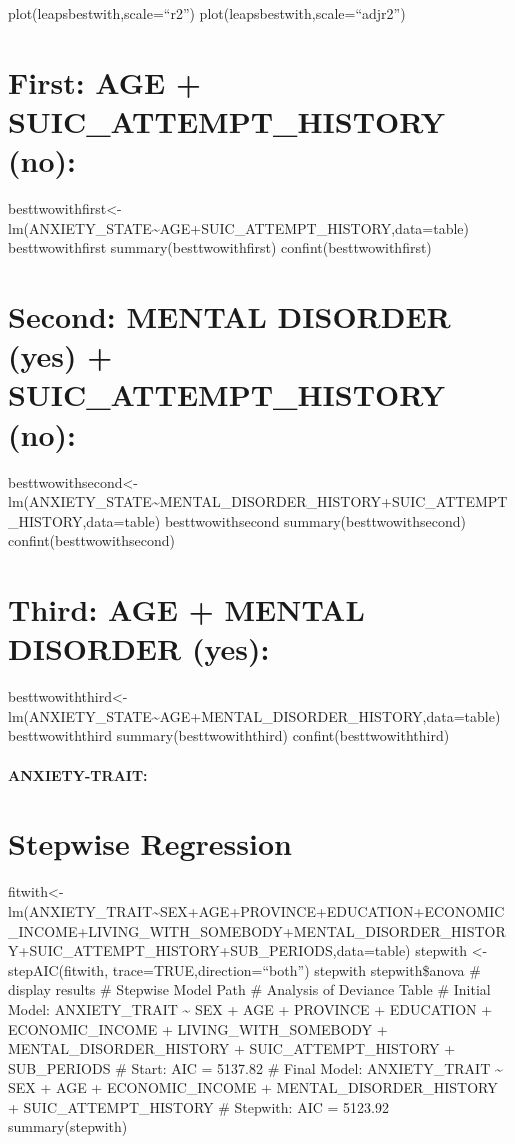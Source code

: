 \documentclass[
]{book}
\begin{document}
plot(leapsbestwith,scale=``r2'')
plot(leapsbestwith,scale=``adjr2'')

\hypertarget{first-age-suic_attempt_history-no-1}{%
\chapter{First: AGE + SUIC\_ATTEMPT\_HISTORY (no):}\label{first-age-suic_attempt_history-no-1}}

besttwowithfirst\textless-lm(ANXIETY\_STATE\textasciitilde AGE+SUIC\_ATTEMPT\_HISTORY,data=table)
besttwowithfirst
summary(besttwowithfirst)
confint(besttwowithfirst)

\hypertarget{second-mental-disorder-yes-suic_attempt_history-no}{%
\chapter{Second: MENTAL DISORDER (yes) + SUIC\_ATTEMPT\_HISTORY (no):}\label{second-mental-disorder-yes-suic_attempt_history-no}}

besttwowithsecond\textless-lm(ANXIETY\_STATE\textasciitilde MENTAL\_DISORDER\_HISTORY+SUIC\_ATTEMPT\_HISTORY,data=table)
besttwowithsecond
summary(besttwowithsecond)
confint(besttwowithsecond)

\hypertarget{third-age-mental-disorder-yes}{%
\chapter{Third: AGE + MENTAL DISORDER (yes):}\label{third-age-mental-disorder-yes}}

besttwowiththird\textless-lm(ANXIETY\_STATE\textasciitilde AGE+MENTAL\_DISORDER\_HISTORY,data=table)
besttwowiththird
summary(besttwowiththird)
confint(besttwowiththird)

\hypertarget{anxiety-trait-2}{%
\subsubsection{ANXIETY-TRAIT:}\label{anxiety-trait-2}}

\hypertarget{stepwise-regression-2}{%
\chapter{Stepwise Regression}\label{stepwise-regression-2}}

fitwith\textless-lm(ANXIETY\_TRAIT\textasciitilde SEX+AGE+PROVINCE+EDUCATION+ECONOMIC\_INCOME+LIVING\_WITH\_SOMEBODY+MENTAL\_DISORDER\_HISTORY+SUIC\_ATTEMPT\_HISTORY+SUB\_PERIODS,data=table)
stepwith \textless- stepAIC(fitwith, trace=TRUE,direction=``both'')
stepwith
stepwith\$anova \# display results
\# Stepwise Model Path
\# Analysis of Deviance Table
\# Initial Model: ANXIETY\_TRAIT \textasciitilde{} SEX + AGE + PROVINCE + EDUCATION + ECONOMIC\_INCOME + LIVING\_WITH\_SOMEBODY + MENTAL\_DISORDER\_HISTORY + SUIC\_ATTEMPT\_HISTORY + SUB\_PERIODS
\# Start: AIC = 5137.82
\# Final Model: ANXIETY\_TRAIT \textasciitilde{} SEX + AGE + ECONOMIC\_INCOME + MENTAL\_DISORDER\_HISTORY + SUIC\_ATTEMPT\_HISTORY
\# Stepwith: AIC = 5123.92
summary(stepwith)
\end{document}
